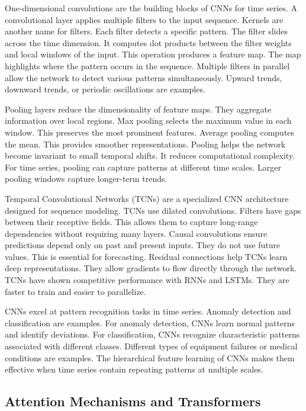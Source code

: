 One-dimensional convolutions are the building blocks of CNNs for time series. A convolutional layer applies multiple filters to the input sequence. Kernels are another name for filters. Each filter detects a specific pattern. The filter slides across the time dimension. It computes dot products between the filter weights and local windows of the input. This operation produces a feature map. The map highlights where the pattern occurs in the sequence. Multiple filters in parallel allow the network to detect various patterns simultaneously. Upward trends, downward trends, or periodic oscillations are examples.

Pooling layers reduce the dimensionality of feature maps. They aggregate information over local regions. Max pooling selects the maximum value in each window. This preserves the most prominent features. Average pooling computes the mean. This provides smoother representations. Pooling helps the network become invariant to small temporal shifts. It reduces computational complexity. For time series, pooling can capture patterns at different time scales. Larger pooling windows capture longer-term trends.

Temporal Convolutional Networks (TCNs) are a specialized CNN architecture designed for sequence modeling. TCNs use dilated convolutions. Filters have gaps between their receptive fields. This allows them to capture long-range dependencies without requiring many layers. Causal convolutions ensure predictions depend only on past and present inputs. They do not use future values. This is essential for forecasting. Residual connections help TCNs learn deep representations. They allow gradients to flow directly through the network. TCNs have shown competitive performance with RNNs and LSTMs. They are faster to train and easier to parallelize.

CNNs excel at pattern recognition tasks in time series. Anomaly detection and classification are examples. For anomaly detection, CNNs learn normal patterns and identify deviations. For classification, CNNs recognize characteristic patterns associated with different classes. Different types of equipment failures or medical conditions are examples. The hierarchical feature learning of CNNs makes them effective when time series contain repeating patterns at multiple scales.

\subsection{Attention Mechanisms and Transformers}

